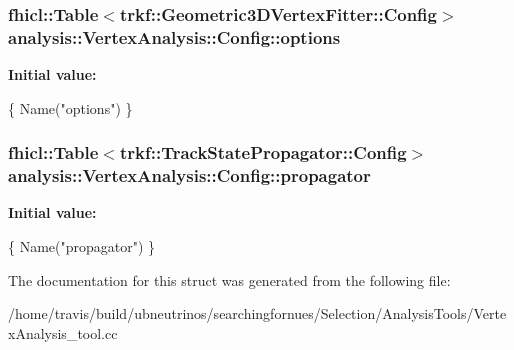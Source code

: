 \subsubsection[{\texorpdfstring{options}{options}}]{\setlength{\rightskip}{0pt plus 5cm}fhicl\+::\+Table$<$trkf\+::\+Geometric3\+D\+Vertex\+Fitter\+::\+Config$>$ analysis\+::\+Vertex\+Analysis\+::\+Config\+::options}\hypertarget{structanalysis_1_1VertexAnalysis_1_1Config_ae53ba2bae95709a9ba1fccc6008ccc84}{}\label{structanalysis_1_1VertexAnalysis_1_1Config_ae53ba2bae95709a9ba1fccc6008ccc84}
{\bfseries Initial value\+:}
\begin{DoxyCode}
\{
      Name(\textcolor{stringliteral}{"options"})
    \}
\end{DoxyCode}
\subsubsection[{\texorpdfstring{propagator}{propagator}}]{\setlength{\rightskip}{0pt plus 5cm}fhicl\+::\+Table$<$trkf\+::\+Track\+State\+Propagator\+::\+Config$>$ analysis\+::\+Vertex\+Analysis\+::\+Config\+::propagator}\hypertarget{structanalysis_1_1VertexAnalysis_1_1Config_a45925f82aad217df01b215388423a076}{}\label{structanalysis_1_1VertexAnalysis_1_1Config_a45925f82aad217df01b215388423a076}
{\bfseries Initial value\+:}
\begin{DoxyCode}
\{
      Name(\textcolor{stringliteral}{"propagator"})
    \}
\end{DoxyCode}


The documentation for this struct was generated from the following file\+:\begin{DoxyCompactItemize}
\item 
/home/travis/build/ubneutrinos/searchingfornues/\+Selection/\+Analysis\+Tools/Vertex\+Analysis\+\_\+tool.\+cc\end{DoxyCompactItemize}
